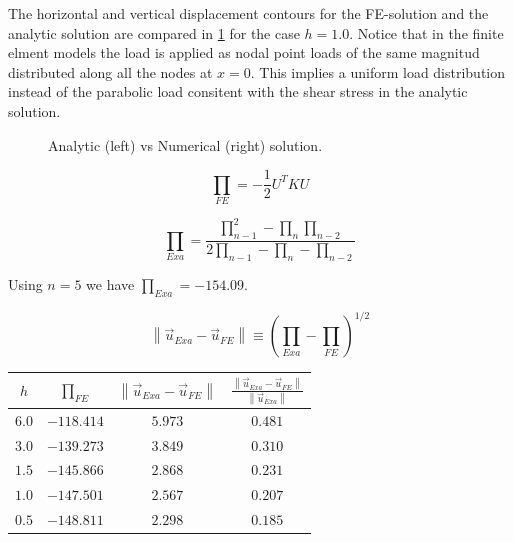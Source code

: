 \documentclass[12pt,letterpaper]{article}
\begin{document}
The horizontal and vertical displacement contours for the FE-solution and the analytic solution are compared in \cref{fig:sls} for the case $h=1.0$. Notice that in the finite elment models the load is applied as nodal point loads of the same magnitud distributed along all the nodes at $x=0$. This implies a uniform load distribution instead of the parabolic load consitent with the shear stress in the analytic solution.

\begin{figure}[H]
\centering
{}
\caption{Analytic (left) vs Numerical (right) solution.}
\label{fig:sls}
\end{figure}

\[{\prod _{FE}} =  - \frac{1}{2}{U^T}KU\]

\[{\prod _{Exa}} = \frac{{\prod _{n - 1}^2 - {\prod _n}{\prod _{n - 2}}}}{{2{\prod _{n - 1}} - {\prod _n} - {\prod _{n - 2}}}}\]

Using $n=5$ we have ${\prod _{Exa}}=-154.09$.

\[\left\| {{{\vec u}_{Exa}} - {{\vec u}_{FE}}} \right\| \equiv {({\prod _{Exa}} - {\prod _{FE}})^{1/2}}\]


\begin{center}
\begin{tabular}{ |c|c|c|c| }
  \hline
  $h$ & ${\prod _{FE}}$ & $\left\| {{{\vec u}_{Exa}} - {{\vec u}_{FE}}} \right\|$ & $\frac{{\left\| {{{\vec u}_{Exa}} - {{\vec u}_{FE}}} \right\|}}{{\left\| {{{\vec u}_{Exa}}} \right\|}}$ \\
  \hline 
  $6.0$  & $-118.414$ & $5.973$  & $0.481$  \\
  \hline
   $3.0$  & $-139.273$ & $3.849$  & $0.310$  \\
  \hline
   $1.5$  & $-145.866$ & $2.868$  & $0.231$  \\
  \hline
   $ 1.0$  & $-147.501$ & $2.567$  & $0.207$  \\
  \hline
  $ 0.5$  & $-148.811$ & $2.298$  & $0.185$  \\
  \hline
\end{tabular}
\label{ejemplo}
\end{center}
\end{document}
